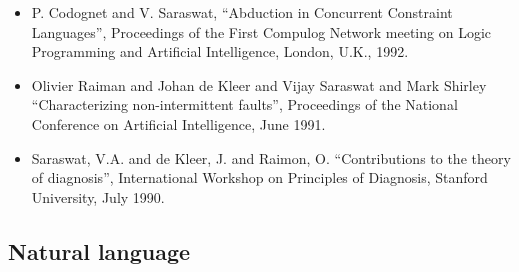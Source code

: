 \documentclass{article}
\begin{document}
\begin{itemize}
\item P. Codognet and V. Saraswat, ``Abduction in Concurrent
  Constraint Languages'', Proceedings of the First Compulog Network
  meeting on Logic Programming and Artificial Intelligence, London,
  U.K., 1992.

\item  Olivier Raiman and Johan de Kleer and Vijay Saraswat and
  Mark Shirley ``Characterizing non-intermittent faults'',
  Proceedings of the National Conference on Artificial
  Intelligence, June 1991.
  
\item  Saraswat, V.A. and de Kleer, J. and Raimon, O.
  ``Contributions to the theory of diagnosis'', International
  Workshop on Principles of Diagnosis, Stanford University, July
  1990.
\end{itemize}
\subsection*{Natural language}
\end{document}
